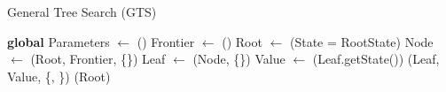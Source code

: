 \begin{algorithm}[H]
    \caption{General Tree Search (GTS)}
    \label{alg:general_tree_search}
    \begin{algorithmic}[1]
    
        \State \textbf{global} Parameters $\leftarrow$ ()
        \State Frontier $\leftarrow$ ()
        \State Root $\leftarrow$ (State = RootState)
            \State Node $\leftarrow$ \select(Root, Frontier, \{\})
            \State Leaf $\leftarrow$ \expand(Node, \{\})
                \State Value $\leftarrow$ \eval(Leaf.getState())
                \State \bp(Leaf, Value, \{, \})
            \EndIf
        \EndWhile
        \State \Return \gbm(Root)
    \EndProcedure
    \end{algorithmic}
\end{algorithm}